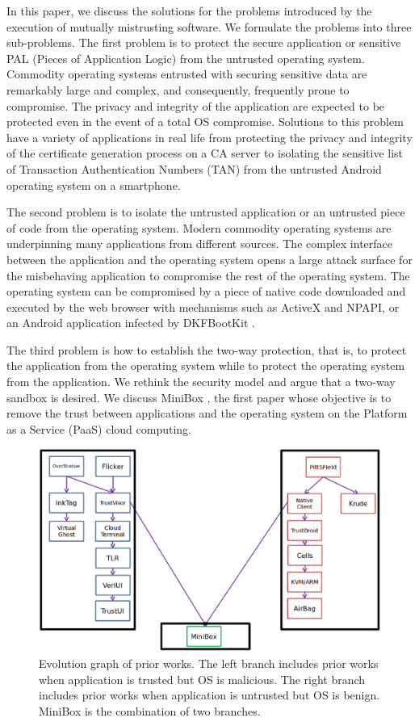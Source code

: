 In this paper, we discuss the solutions for the problems introduced by the
execution of mutually mistrusting software. We formulate the problems into
three sub-problems. The first problem is to protect the secure application or
sensitive PAL (Pieces of Application Logic) from the untrusted operating
system. Commodity operating systems entrusted with securing sensitive data are
remarkably large and complex, and consequently, frequently prone to compromise.
The privacy and integrity of the application are expected to be protected even
in the event of a total OS compromise. Solutions to this problem have a variety
of applications in real life from protecting the privacy and integrity of the
certificate generation process on a CA server to isolating the sensitive list
of Transaction Authentication Numbers (TAN) from the untrusted Android
operating system on a smartphone.

The second problem is to isolate the untrusted application or an untrusted
piece of code from the operating system. Modern commodity operating systems are
underpinning many applications from different sources. The complex interface
between the application and the operating system opens a large attack surface
for the misbehaving application to compromise the rest of the operating system.
The operating system can be compromised by a piece of native code downloaded
and executed by the web browser with mechanisms such as ActiveX and NPAPI, or
an Android application infected by DKFBootKit \cite{DKFBootKit}.

The third problem is how to establish the two-way protection, that is, to
protect the application from the operating system while to protect the
operating system from the application. We rethink the security model and argue
that a two-way sandbox is desired.  We discuss MiniBox \cite{MiniBox}, the
first paper whose objective is to remove the trust between applications and the
operating system on the Platform as a Service (PaaS) cloud computing.

\begin{figure}[htb]
\centering
\includegraphics[width=1.5\columnwidth]{figures/evolution.eps}
\caption{Evolution graph of prior works. The left branch includes prior works
when application is trusted but OS is malicious. The right branch includes
prior works when application is untrusted but OS is benign. MiniBox is the
combination of two branches.}
\label{fig:evolution}
\end{figure}

